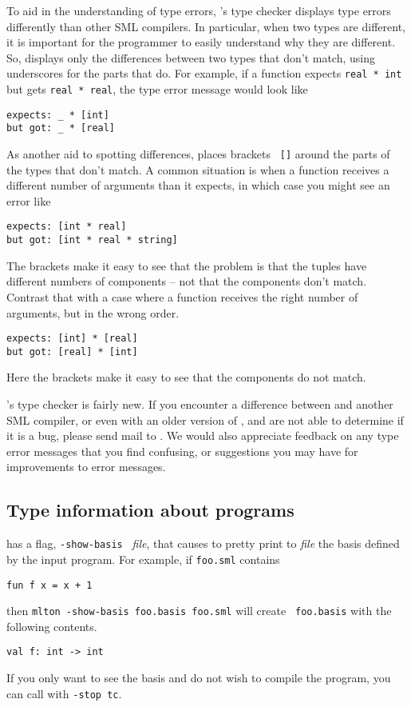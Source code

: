 To aid in the understanding of type errors, {\mlton}'s type checker
displays type errors differently than other SML compilers.  In
particular, when two types are different, it is important for the
programmer to easily understand why they are different.  So, {\mlton}
displays only the differences between two types that don't match,
using underscores for the parts that do.  For example, if a
function expects {\tt real * int} but gets {\tt real * real}, the type
error message would look like
\begin{verbatim}
expects: _ * [int]
but got: _ * [real]
\end{verbatim}
As another aid to spotting differences, {\mlton} places brackets {\tt
[]} around the parts of the types that don't match.  A common
situation is when a function receives a different number of arguments
than it expects, in which case you might see an error like
\begin{verbatim}
expects: [int * real]
but got: [int * real * string]
\end{verbatim}
The brackets make it easy to see that the problem is that the tuples
have different numbers of components -- not that the components don't
match.  Contrast that with a case where a function receives the right
number of arguments, but in the wrong order.
\begin{verbatim}
expects: [int] * [real]
but got: [real] * [int]
\end{verbatim}
Here the brackets make it easy to see that the components do not
match.

{\mlton}'s type checker is fairly new.  If you encounter a difference
between {\mlton} and another SML compiler, or even with an older
version of {\mlton}, and are not able to determine if it is a bug,
please send mail to {\mltonmail}.  We would also appreciate feedback
on any type error messages that you find confusing, or suggestions you
may have for improvements to error messages.

\subsection{Type information about programs}

{\mlton} has a flag, {\tt -show-basis } {\it file}, that causes
{\mlton} to pretty print to {\it file} the basis defined by the input
program.  For example, if {\tt foo.sml} contains
\begin{verbatim}
fun f x = x + 1
\end{verbatim}
then {\tt mlton -show-basis foo.basis foo.sml} will create {\tt
foo.basis} with the following contents.
\begin{verbatim}
val f: int -> int
\end{verbatim}
If you only want to see the basis and do not wish to compile the
program, you can call {\mlton} with {\tt -stop tc}.

